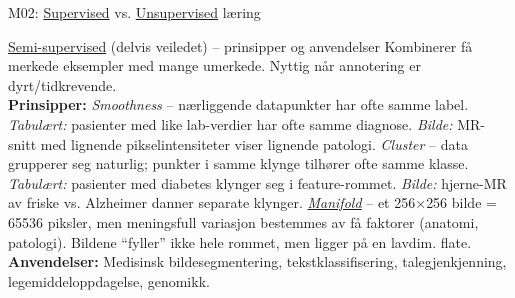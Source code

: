 \documentclass[aspectratio=169, 10pt]{beamer}
\begin{document}
\begin{frame}{M02: \href{https://en.wikipedia.org/wiki/Supervised_learning}{Supervised} vs. \href{https://en.wikipedia.org/wiki/Unsupervised_learning}{Unsupervised} læring}
    \vspace{2mm}
    \begin{block}{\footnotesize \href{https://en.wikipedia.org/wiki/Semi-supervised_learning}{Semi-supervised} (delvis veiledet) -- prinsipper og anvendelser}
        \scriptsize
        Kombinerer få merkede eksempler med mange umerkede. Nyttig når annotering er dyrt/tidkrevende.\\[2pt]
        \textbf{Prinsipper:}
        \textit{Smoothness} -- nærliggende datapunkter har ofte samme label. \textit{Tabulært:} pasienter med like lab-verdier har ofte samme diagnose. \textit{Bilde:} MR-snitt med lignende pikselintensiteter viser lignende patologi.
        \textit{Cluster} -- data grupperer seg naturlig; punkter i samme klynge tilhører ofte samme klasse. \textit{Tabulært:} pasienter med diabetes klynger seg i feature-rommet. \textit{Bilde:} hjerne-MR av friske vs. Alzheimer danner separate klynger.
        \href{https://en.wikipedia.org/wiki/Manifold_hypothesis}{\textit{Manifold}} -- et 256$\times$256 bilde = 65536 piksler, men meningsfull variasjon bestemmes av få faktorer (anatomi, patologi). Bildene ``fyller'' ikke hele rommet, men ligger på en lavdim. flate.\\[2pt]
        \textbf{Anvendelser:} Medisinsk bildesegmentering, tekstklassifisering, talegjenkjenning, legemiddeloppdagelse, genomikk.
    \end{block}

\end{frame}
\end{document}
